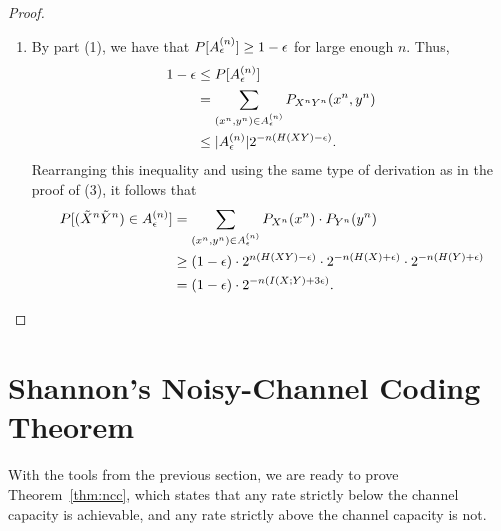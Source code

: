\begin{proof}
\begin{enumerate}
\begin{align}
\end{align}
Combining this with part (2) of this theorem, we get
\begin{align}
P[(\tilde{X}^n\tilde{Y}^n) \in \typset] &\leq 2^{n(H(XY) + \epsilon)} \cdot 2^{-n(H(X) - \epsilon)} \cdot 2^{-n(H(Y)-\epsilon)}\nonumber\\
&= 2^{-n(-H(XY) + H(X) + H(Y) -3\epsilon)}\nonumber\\
&= 2^{-n(I(X;Y) - 3\epsilon)}.
\end{align}
This completes the proof of the third part.
\item By part (1), we have that $P[A_{\epsilon}^{(n)}] \geq 1 - \epsilon$ for large enough $n$. Thus,
\begin{align}
1-\epsilon &\leq P[A_{\epsilon}^{(n)}]\nonumber\\
&= \sum_{(x^n,y^n) \in A_{\epsilon}^{(n)}} P_{X^nY^n}(x^n,y^n)\nonumber\\
&\leq |A_{\epsilon}^{(n)}| 2^{-n(H(XY) - \epsilon)}.
\end{align}
Rearranging this inequality and using the same type of derivation as in the proof of (3), it follows that
\begin{align}
P[(\tilde{X}^n\tilde{Y}^n) \in A_{\epsilon}^{(n)}]
&= \sum_{(x^n,y^n) \in A_{\epsilon}^{(n)}} P_{X^n}(x^n) \cdot P_{Y^n}(y^n)\nonumber\\
&\geq (1-\epsilon) \cdot 2^{n(H(XY) - \epsilon)} \cdot 2^{-n(H(X) + \epsilon)} \cdot 2^{-n(H(Y) + \epsilon)}\nonumber\\
&= (1 - \epsilon) \cdot 2^{-n(I(X;Y) + 3\epsilon)}.
\end{align}
\end{enumerate}
\end{proof}

\section{Shannon's Noisy-Channel Coding Theorem}
With the tools from the previous section, we are ready to prove Theorem~\ref{thm:ncc}, which states that any rate strictly below the channel capacity is achievable, and any rate strictly above the channel capacity is not.


